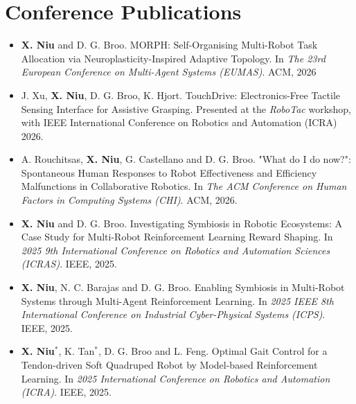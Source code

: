 \documentclass[a4paper,11pt]{article}
\newcommand{\resumeSubHeadingListStart}{\begin{itemize}[leftmargin=*,labelsep=0mm,itemsep=-2pt]}
\newcommand{\resumeSubHeadingListEnd}{\end{itemize}\vspace{2mm}}
\begin{document}
\section{\textbf{Conference Publications}}
\resumeSubHeadingListStart
\vspace{3mm}
  \item \hspace{0.3mm} \textbf{X. Niu} and D. G. Broo. MORPH: Self-Organising Multi-Robot Task Allocation via Neuroplasticity-Inspired Adaptive Topology. In \textit{The 23rd European Conference on Multi-Agent Systems (EUMAS)}. ACM, 2026
  \item \hspace{0.3mm} J. Xu, \textbf{X. Niu}, D. G. Broo, K. Hjort. TouchDrive: Electronics-Free Tactile Sensing Interface for Assistive Grasping. Presented at the \textit{RoboTac} workshop, with IEEE International Conference on Robotics and Automation (ICRA) 2026.
  \item \hspace{0.3mm} A. Rouchitsas, \textbf{X. Niu}, G. Castellano and D. G. Broo. "What do I do now?": Spontaneous Human Responses to Robot Effectiveness and Efficiency Malfunctions in Collaborative Robotics. In \textit{The ACM Conference on Human Factors in Computing Systems (CHI)}. ACM, 2026.
  \item \hspace{0.3mm} \textbf{X. Niu} and D. G. Broo. Investigating Symbiosis in Robotic Ecosystems: A Case Study for Multi-Robot Reinforcement Learning Reward Shaping. In \textit{2025 9th International Conference on Robotics and Automation Sciences (ICRAS)}. IEEE, 2025.
  \item \hspace{0.3mm} \textbf{X. Niu}, N. C. Barajas and D. G. Broo. Enabling Symbiosis in Multi-Robot Systems through Multi-Agent Reinforcement Learning. In \textit{2025 IEEE 8th International Conference on Industrial Cyber-Physical Systems (ICPS)}. IEEE, 2025.
  \item \hspace{0.3mm} \textbf{X. Niu}$^*$, K. Tan$^*$, D. G. Broo and L. Feng. Optimal Gait Control for a Tendon-driven Soft Quadruped Robot by Model-based Reinforcement Learning. In \textit{2025 International Conference on Robotics and Automation (ICRA)}. IEEE, 2025.
\resumeSubHeadingListEnd
\vspace{-5.5mm}
\end{document}
